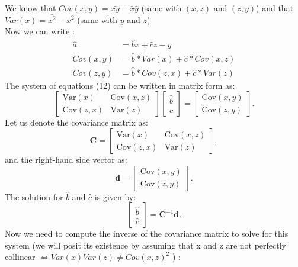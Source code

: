 \documentclass{article}
\begin{document}
We know that $Cov(x,y) = \bar{xy}-\bar{x}\bar{y}$ (same with $(x,z)$ and $(z,y)$) and that $Var(x)=\bar{x^2}-\bar{x}^2$ (same with $y$ and $z$)\\
Now we can write : 
\begin{equation}
\begin{aligned}
\hat{a} &=  \hat{b}\bar{x} + \hat{c}\bar{z} - \bar{y}\\
Cov(x,y) &= \hat{b}*Var(x)+ \hat{c}*Cov(x,z)\\
Cov(z,y) &= \hat{b}*Cov(z,x) + \hat{c}*Var(z)
\end{aligned}
\end{equation}
The system of equations (12) can be written in matrix form as:
\begin{equation}
    \begin{bmatrix}    \text{Var}(x) & \text{Cov}(x, z) \\    \text{Cov}(z, x) & \text{Var}(z)\end{bmatrix}\begin{bmatrix}    \hat{b} \\    \hat{c}\end{bmatrix}=\begin{bmatrix}    \text{Cov}(x, y) \\    \text{Cov}(z, y)\end{bmatrix}.
\end{equation}
Let us denote the covariance matrix as:
\begin{equation}
    \mathbf{C} =\begin{bmatrix}    \text{Var}(x) & \text{Cov}(x, z) \\    \text{Cov}(z, x) & \text{Var}(z)\end{bmatrix},
\end{equation}
and the right-hand side vector as:
\begin{equation}
   \mathbf{d} =\begin{bmatrix}    \text{Cov}(x, y) \\    \text{Cov}(z, y)\end{bmatrix}.
\end{equation}
The solution for $\hat{b}$ and $\hat{c}$ is given by:\\
$$\begin{bmatrix}    \hat{b} \\    \hat{c}\end{bmatrix}= \mathbf{C}^{-1} \mathbf{d}.$$
Now we need to compute the inverse of the covariance matrix to solve for this system (we will posit its existence by assuming that x and z are not perfectly collinear $\Leftrightarrow Var(x)Var(z)\neq Cov(x,z)^2$ ) : \\
\end{document}

